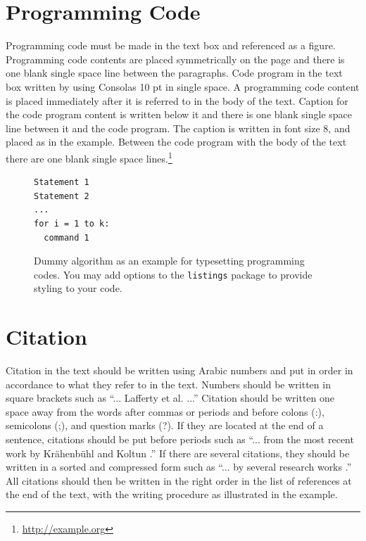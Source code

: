 \documentclass[conference, compsoc, twoside]{IEEEtran}
\begin{document}
\section{Programming Code}
Programming code must be made in the text box and referenced as a figure. Programming code contents are placed symmetrically on the page and there is one blank single space line between the paragraphs. Code program in the text box written by using Consolas 10 pt  in single space. A programming code content is placed immediately after it is referred to in the body of the text. Caption for the code program content is written below it and there is one blank single space line between it and the code program. The caption is written in font size 8, and placed as in the example. Between the code program with the body of the text there are one blank single space lines.\footnote{\url{http://example.org}}

\begin{figure}[h]
    \centering
\begin{lstlisting}[frame=single]
Statement 1
Statement 2
...
for i = 1 to k:
  command 1
\end{lstlisting}
\caption{Dummy algorithm as an example for typesetting programming codes. You may add options to the \texttt{listings} package to provide styling to your code.}
    \label{fig:code}
\end{figure}

\section{Citation}
Citation in the text should be written using Arabic numbers and put in order in accordance to what they refer to in the text. Numbers should be written in square brackets such as ``... Lafferty et al. \cite{Lafferty:2001:CRF:645530.655813} ...'' Citation should be written one space away from the words after commas or periods and before colons (:), semicolons (;), and question marks (?). If they are located at the end of a sentence, citations should be put before periods such as ``... from the most recent work by Kr\"{a}henb\"{u}hl and Koltun \cite{NIPS2011_4296}.'' If there are several citations, they should be written in a sorted and compressed form such as ``... by several research works \cite{Lafferty:2001:CRF:645530.655813,10.1109/TPAMI.2011.231,article.ChenPKMY14,article.farabet} .'' All citations should then be written in the right order in the list of references at the end of the text, with the writing procedure as illustrated in the example.
\end{document}
